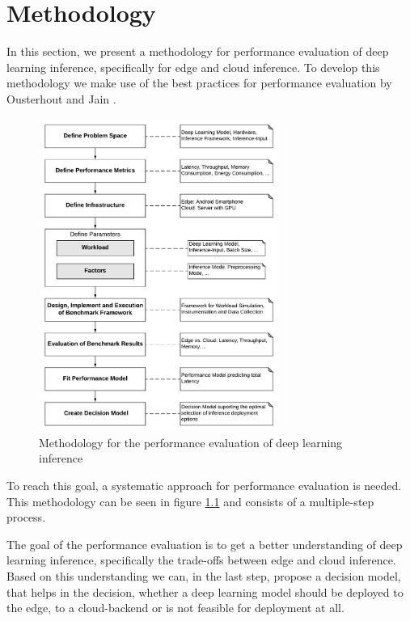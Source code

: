 \chapter{Methodology}
\label{chap:methodology}

In this section, we present a methodology for performance evaluation of deep learning inference, specifically for edge and cloud inference.
To develop this methodology we make use of the best practices for performance evaluation by Ousterhout \cite{Ousterhout:2018:AMO:3234519.3213770} and Jain \cite{books/daglib/0076234}.


\begin{figure}[!htb]
\centering
\includegraphics[width=0.7\textwidth]{./Bilder/Methodology.pdf}
\caption{Methodology for the performance evaluation of deep learning inference}
\label{fig:Methodology}
\end{figure}
To reach this goal, a systematic approach for performance evaluation is needed.
This methodology can be seen in figure \ref{fig:Methodology} and consists of a multiple-step process.


The goal of the performance evaluation is to get a better understanding of deep learning inference, specifically the trade-offs between edge and cloud inference.
Based on this understanding we can, in the last step, propose a decision model, that helps in the decision, whether a deep learning model should be deployed to the edge, to a cloud-backend or is not feasible for deployment at all.


